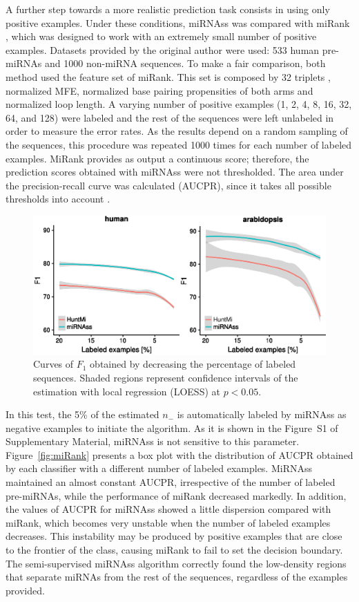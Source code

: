 \documentclass{article}
\begin{document}
A further step towards a more realistic prediction task consists in using only positive examples. Under these conditions, miRNAss was compared with miRank \citep{xu2008microrna}, which was designed to work with an extremely small number of positive examples. Datasets provided by the original author were used: 533 human pre-miRNAs and 1000 non-miRNA sequences. To make a fair comparison, both method used the feature set of miRank. This set is composed by 32 triplets \citep{xue2005classification}, normalized MFE, normalized base pairing propensities of both arms and normalized loop length. A varying number of positive examples (1, 2, 4, 8, 16, 32, 64, and 128) were labeled and the rest of the sequences were left unlabeled in order to measure the error rates. As the results depend on a random sampling of the sequences, this procedure was repeated 1000 times for each number of labeled examples. MiRank provides as output a continuous score; therefore, the prediction scores obtained with miRNAss were not thresholded. The area under the precision-recall curve was calculated (AUCPR), since it takes all possible thresholds into account \citep{bradley1997use}.
\begin{figure}[tpb]
	\centering
	\includegraphics[width=0.6\linewidth]{few_samples_huntmi.eps}
	\caption{Curves of $F_{1}$ obtained by decreasing the percentage of labeled sequences. Shaded regions represent confidence intervals of the estimation with local regression (LOESS) at $p < 0.05$.}
	\label{fig:fewSamples:huntmi}
\end{figure}

In this test, the 5\% of the estimated $n_{-}$ is automatically labeled by miRNAss as negative examples to initiate the algorithm. As it is shown in the Figure~S1 of Supplementary Material, miRNAss is not sensitive to this parameter. Figure~\ref{fig:miRank} presents a box plot with the distribution of AUCPR obtained by each classifier with a different number of labeled examples. MiRNAss maintained an almost constant AUCPR, irrespective of the number of labeled pre-miRNAs, while the performance of miRank decreased markedly. In addition, the values of AUCPR for miRNAss showed a little dispersion compared with miRank, which becomes very unstable when the number of labeled examples decreases. This instability may be produced by positive examples that are close to the frontier of the class, causing miRank to fail to set the decision boundary. The semi-supervised miRNAss algorithm correctly found the low-density regions that separate miRNAs from the rest of the sequences, regardless of the examples provided.
\end{document}

